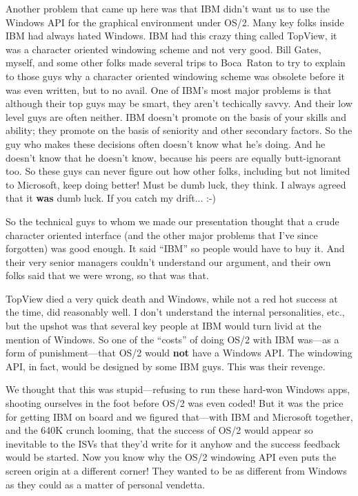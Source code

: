 Another problem that came up here was that IBM didn't want us to use the
Windows API for the graphical environment under OS/2.  Many key folks
inside IBM had always hated Windows.  IBM had this crazy thing
called TopView,
it was a character oriented windowing scheme and not very good.  Bill Gates,
myself, and some other folks made several trips to Boca~Raton to try
to explain to those guys why a character oriented windowing scheme was
obsolete before it was even written, but to no avail.  One of IBM's most
major problems is that although their top guys may be smart, they
aren't techically savvy.  And their low level guys are often neither.
IBM doesn't promote on the basis of your skills and ability; they promote
on the basis of seniority and other secondary factors.  So the guy
who makes these decisions often doesn't know what he's doing.  And he
doesn't know that he doesn't know, because his peers are equally
butt-ignorant too.  So these guys can never figure out how other folks, 
including but not limited to Microsoft, keep doing better!  Must be dumb luck, 
they think.  I always agreed that it {\bf was} dumb luck.  If you catch my
drift... :-)

So the technical guys to whom we made our presentation thought that
a crude character oriented interface (and the other major problems
that I've since forgotten) was good enough.  It said ``IBM'' so people would
have to buy it.  And their very senior managers couldn't understand our
argument, and their own folks said that we were wrong, so that was that.

TopView died a very quick death and Windows, while not a red hot success
at the time, did reasonably well.  I don't understand the internal
personalities, etc., but the upshot was that several key people at IBM
would turn livid at the mention of Windows.  So one of the ``costs'' of
doing OS/2 with IBM was---as a form of punishment---that OS/2 would
{\bf not} have a Windows API\hbox{}.  The windowing API, in fact, would be designed
by some IBM guys.  This was their revenge.

We thought that this was stupid---refusing to run
these hard-won Windows apps, shooting ourselves in the foot before OS/2
was even coded!  But it was the price for getting IBM on board and we
figured that---with IBM and Microsoft together, and the 640K crunch
looming, that the success of OS/2 would appear so inevitable to the ISVs that
they'd write for it anyhow and the success feedback would be started.
Now you know why the OS/2 windowing API even puts the screen origin at
a different corner!  They wanted to be as different from Windows as they
could as a matter of personal vendetta.

